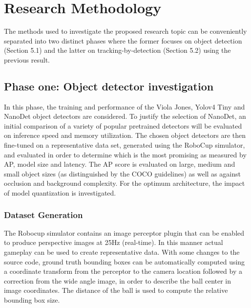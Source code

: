 \documentclass[a4paper,twoside,12pt]{report}
\begin{document}
\chapter{Research Methodology}

The methods used to investigate the proposed research topic can be conveniently separated into two distinct phases where the former focuses on object detection (Section 5.1) and the latter on tracking-by-detection (Section 5.2) using the previous result. 

\section{Phase one: Object detector investigation}

In this phase, the training and performance of the Viola Jones, Yolov4 Tiny and NanoDet object detectors are considered. To justify the selection of NanoDet, an initial comparison of a variety of popular pretrained detectors will be evaluated on inference speed and memory utilization. The chosen object detectors are then fine-tuned on a representative data set, generated using the RoboCup simulator, and evaluated in order to determine which is the most promising as measured by AP, model size and latency. The AP score is evaluated on large, medium and small object sizes (as distinguished by the COCO guidelines) as well as against occlusion and background complexity. For the optimum architecture, the impact of model quantization is investigated.

\subsection{Dataset Generation}

The Robocup simulator contains an image perceptor plugin that can be enabled to produce perspective images at 25Hz (real-time). In this manner actual gameplay can be used to create representative data. 
With some changes to the source code, ground truth bounding boxes can be automatically computed using a coordinate transform from the perceptor to the camera location followed by a correction from the wide angle image, in order to describe the ball center in image coordinates. The distance of the ball is used to compute the relative bounding box size.
\end{document}
